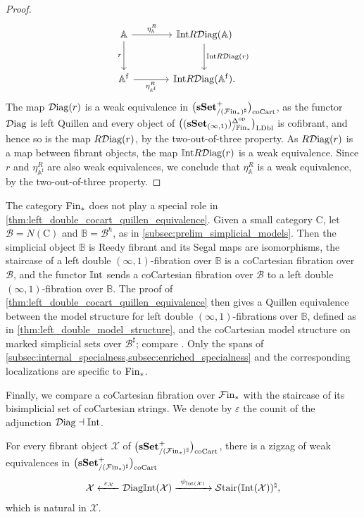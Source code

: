 \documentclass[10pt,reqno]{amsart}
\begin{document}
\begin{proof}
\[\begin{tikzcd}[ampersand replacement=\&, sep=large]
 \mathbb A
   \arrow[r,"\eta^R_{\mathbb A}"]
   \arrow[d,"r"']
 \&\Int R\Diag(\mathbb A)
   \arrow[d,"\Int R\Diag(r)"]
 \\
 \mathbb A^{\mathrm f}
   \arrow[r,"\eta^R_{\mathbb A^{\mathrm f}}"']
 \&\Int R\Diag(\mathbb A^{\mathrm f}).
\end{tikzcd}
\]
The map $\mathcal{D}\mathrm{iag}(r)$ is a weak equivalence in $\bigl(\mathbf{sSet}^+_{/(\mathcal{F}\mathrm{in}_*)^\sharp}\bigr)_{\mathrm{coCart}}$, as the
functor $\mathcal{D}\mathrm{iag}$ is left Quillen and every object of $\bigl((\mathbf{sSet}_{(\infty,1)})^{\Delta^{\mathrm{op}}}_{/\mathbb{F}\mathrm{in}_*}\bigr)_{\mathrm{LDbl}}$ is
cofibrant, and hence so is the map $R\mathcal{D}\mathrm{iag}(r)$, by the
two-out-of-three property. As $R\mathcal{D}\mathrm{iag}(r)$ is a map between fibrant
objects, the map $\mathbb{I}\mathrm{nt} R\mathcal{D}\mathrm{iag}(r)$ is a weak equivalence. Since $r$
and $\eta^R_{\mathbb A^{\mathrm f}}$ are also weak equivalences, we
conclude that $\eta^R_{\mathbb A}$ is a weak equivalence, by the
two-out-of-three property.
\end{proof}

\begin{rmk}
\label{rem:general_base}
The category $\mathrm{Fin}_*$ does not play a special role in
\cref{thm:left_double_cocart_quillen_equivalence}. Given a small
category $\mathrm C$, let $\mathcal B=N(\mathrm C)$ and
$\mathbb B=\mathcal B^h$, as in
\cref{subsec:prelim_simplicial_models}. Then the simplicial object
$\mathbb B$ is Reedy fibrant and its Segal maps are isomorphisms,
the staircase of a left double $(\infty,1)$-fibration over
$\mathbb B$ is a coCartesian fibration over $\mathcal B$, and the
functor $\mathbb{I}\mathrm{nt}$ sends a coCartesian fibration over $\mathcal B$ to a
left double $(\infty,1)$-fibration over $\mathbb B$. The proof of
\cref{thm:left_double_cocart_quillen_equivalence} then gives a Quillen
equivalence between the model structure for left double
$(\infty,1)$-fibrations over $\mathbb B$, defined as in
\cref{thm:left_double_model_structure}, and the coCartesian model
structure on marked simplicial sets over $\mathcal B^\sharp$;
compare \cite[Corollary~4.35]{Nuiten2023}. Only the spans of
\cref{subsec:internal_specialness,subsec:enriched_specialness} and the
corresponding localizations are specific to $\mathrm{Fin}_*$.
\end{rmk}

Finally, we compare a coCartesian fibration over $\mathcal{F}\mathrm{in}_*$ with the
staircase of its bisimplicial set of coCartesian strings. We denote by
$\varepsilon$ the counit of the adjunction $\mathcal{D}\mathrm{iag}\dashv\mathbb{I}\mathrm{nt}$.

\begin{theorem}
\label{thm:second_roundtrip_comparison}
For every fibrant object $\mathcal X$ of $\bigl(\mathbf{sSet}^+_{/(\mathcal{F}\mathrm{in}_*)^\sharp}\bigr)_{\mathrm{coCart}}$, there is a
zigzag of weak equivalences in $\bigl(\mathbf{sSet}^+_{/(\mathcal{F}\mathrm{in}_*)^\sharp}\bigr)_{\mathrm{coCart}}$
\begin{equation}
\label{eq:compat_second_roundtrip}
 \mathcal X\xleftarrow{\ \varepsilon_{\mathcal X}\ }\mathcal{D}\mathrm{iag}\mathbb{I}\mathrm{nt}(\mathcal X)
 \xrightarrow{\ \psi_{\mathbb{I}\mathrm{nt}(\mathcal X)}\ }\mathcal{S}\mathrm{tair}(\mathbb{I}\mathrm{nt}(\mathcal X))^\natural,
\end{equation}
which is natural in $\mathcal X$.
\end{theorem}
\end{document}

